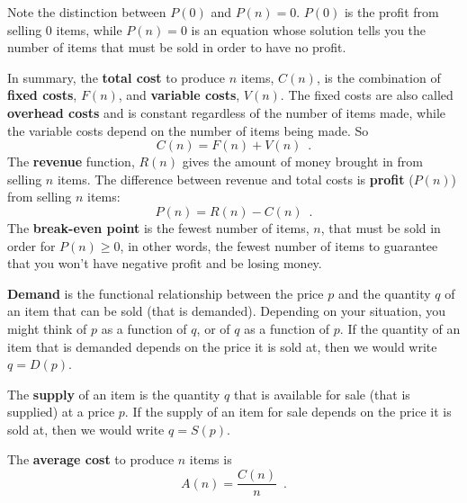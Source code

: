 \begin{remark}
Note the distinction between $P(0)$ and $P(n)=0$. $P(0)$ is the profit from selling 0 items, while $P(n)=0$ is an equation whose solution tells you the number of items that must be sold in order to have no profit.
\end{remark}

\begin{definition}
In summary, the {\bf total cost} to produce $n$ items, $C(n)$, is the combination of {\bf fixed costs}, $F(n)$, and {\bf variable costs}, $V(n)$. The fixed costs are also called {\bf overhead costs} and is constant regardless of the number of items made, while the variable costs depend on the number of items being made. So
$$C(n) = F(n) + V(n)\enspace .$$
The {\bf revenue} function, $R(n)$ gives the amount of money brought in from selling $n$ items. The difference between revenue and total costs is {\bf profit} ($P(n)$) from selling $n$ items:
$$ P(n) = R(n) - C(n)\enspace .$$
The {\bf break-even point} is the fewest number of items, $n$, that must be sold in order for $P(n) \geq 0$, in other words, the fewest number of items to guarantee that you won't have negative profit and be losing money.
\end{definition}
\begin{definition}
{\bf Demand} is the functional relationship between the price $p$ and the quantity $q$ of an item that can be sold (that is demanded). Depending on your situation, you might think of $p$ as a function of $q$, or of $q$ as a function of $p$. If the quantity of an item that is demanded depends on the price it is sold at, then we would write $q = D(p)$.
\end{definition}
\begin{definition}
The {\bf supply} of an item is the quantity $q$ that is available for sale (that is supplied) at a price $p$. If the supply of an item for sale depends on the price it is sold at, then we would write $q = S(p)$.
\end{definition}
\begin{definition}
\label{def:avgcost}
The {\bf average cost} to produce $n$ items is 
$$A(n) = \frac{C(n)}{n} \enspace .$$
\end{definition}

